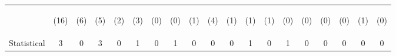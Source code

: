 \begin{tabular}{lcccccccccccccccccc}
 & \begin{footnotesize}(16)\end{footnotesize} & \begin{footnotesize}(6)\end{footnotesize} & \begin{footnotesize}(5)\end{footnotesize} & \begin{footnotesize}(2)\end{footnotesize} & \begin{footnotesize}(3)\end{footnotesize} & \begin{footnotesize}(0)\end{footnotesize} & \begin{footnotesize}(0)\end{footnotesize} & \begin{footnotesize}(1)\end{footnotesize} & \begin{footnotesize}(4)\end{footnotesize} & \begin{footnotesize}(1)\end{footnotesize} & \begin{footnotesize}(1)\end{footnotesize} & \begin{footnotesize}(1)\end{footnotesize} & \begin{footnotesize}(0)\end{footnotesize} & \begin{footnotesize}(0)\end{footnotesize} & \begin{footnotesize}(0)\end{footnotesize} & \begin{footnotesize}(0)\end{footnotesize} & \begin{footnotesize}(1)\end{footnotesize} & \begin{footnotesize}(0)\end{footnotesize}\\
\noalign{\smallskip}Statistical & 3 & 0 & 3 & 0 & 1 & 0 & 1 & 0 & 0 & 0 & 1 & 0 & 1 & 0 & 0 & 0 & 0 & 0\\

\end{tabular}
